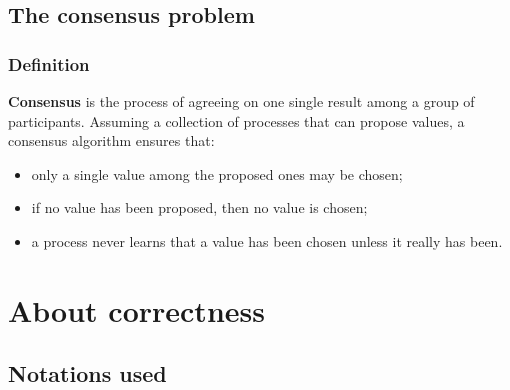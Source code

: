 \documentclass[10 pt]{beamer}
\begin{document}
\subsection{The consensus problem}


\begin{frame}
  \frametitle{Definition}
  
  \textbf{Consensus} is the process of agreeing on one single result among a group of participants. Assuming a collection of processes that can propose values, a consensus algorithm ensures that:
  
  \begin{itemize}
    \item only a single value among the proposed ones may be chosen;
    \item if no value has been proposed, then no value is chosen;
    \item a process never learns that a value has been chosen unless it really has been.
  \end{itemize}



\end{frame}



\section{About correctness}

\subsection{Notations used}
\end{document}
